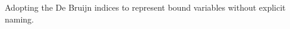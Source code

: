 \begin{code}%
\>[0]\AgdaSpace{}%
\AgdaSpace{}%
\AgdaSymbol{:}\AgdaSpace{}%
\AgdaSpace{}%
\<%
\\
\>[0][@{}l@{\AgdaIndent{0}}]%
\>[2]\AgdaInductiveConstructor{*}%
\>[6]\AgdaSymbol{:}\AgdaSpace{}%
\<%
\\
%
\>[2]\AgdaSpace{}%
\AgdaSymbol{:}\AgdaSpace{}%
\AgdaSpace{}%
\AgdaSpace{}%
\AgdaSpace{}%
\AgdaSpace{}%
\<%
\\
%
\\[\AgdaEmptyExtraSkip]%
\>[0]\AgdaSpace{}%
\AgdaSpace{}%
\AgdaSymbol{:}\AgdaSpace{}%
\AgdaSpace{}%
\<%
\\
\>[0][@{}l@{\AgdaIndent{0}}]%
\>[2]%
\>[6]\AgdaSymbol{:}\AgdaSpace{}%
\<%
\\
%
\>[2]\AgdaSpace{}%
\AgdaSymbol{:}\AgdaSpace{}%
\AgdaSpace{}%
\AgdaSpace{}%
\AgdaSpace{}%
\AgdaSpace{}%
\<%
\end{code}

\begin{code}[hide]%
\>[0]\AgdaSpace{}%
\AgdaSpace{}%
\AgdaSpace{}%
\AgdaSpace{}%
\AgdaSymbol{:}\AgdaSpace{}%
\<%
\\
\>[0]\AgdaSpace{}%
\AgdaSpace{}%
\AgdaSpace{}%
\AgdaSymbol{:}\AgdaSpace{}%
\<%
\end{code}

Adopting the De Bruijn indices to represent bound variables without explicit naming.

